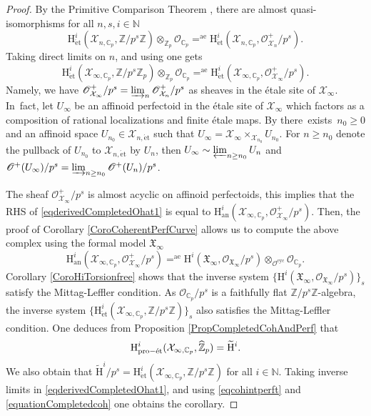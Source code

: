 \documentclass[11pt]{article}
\newcommand{\rae}{\mathrm{ae}}
\newcommand{\an}{\mathrm{an}}
\newcommand{\cyc}{\mathrm{cyc}}
\newcommand{\et}{\mathrm{\acute{e}t}}
\newcommand{\proet}{\mathrm{pro}\textup{-}\et}
\numberwithin{equation}{section}
\theoremstyle{definition}
\newcommand{\bb}[1]{\mathbb{#1}}
\newcommand{\n}[1]{\mathcal{#1}}
\newcommand{\f}[1]{\mathfrak{#1}}
\newcommand{\s}[1]{\mathscr{#1}}
\begin{document}
\begin{proof}
By the Primitive Comparison Theorem \cite[Th.\,5.1]{MR3090230}, there are almost quasi-isomorphisms for all $n,s,i\in \bb{N}$
\[
\mathrm{H}^i_{\et}(\n{X}_{n,\bb{C}_p}, \bb{Z}/p^s \bb{Z})\otimes_{\bb{Z}_p} \n{O}_{\bb{C}_p} =^{\rae} \mathrm{H}^i_{\et}(\n{X}_{n,\bb{C}_p}, \s{O}^+_{\n{X}_n} /p^s).
\]
Taking direct limits on $n$, and using \cite[Cor.,7.18]{MR3090258} one gets
\begin{equation}
\label{eqderivedCompletedOhat1}
\mathrm{H}^i_{\et}(\n{X}_{\infty, \bb{C}_p}, \bb{Z}/p^s \bb{Z}_p) \otimes_{\bb{Z}_p} \n{O}_{\bb{C}_p} =^{\rae} \mathrm{H}^i_{\et}(\n{X}_{\infty, \bb{C}_p}, \s{O}_{\n{X}_{\infty}}^+/p^s).
\end{equation}
Namely, we have $\s{O}^+_{\n{X}_{\infty}}/p^s= \varinjlim_{n} \s{O}^+_{\n{X}_n}/p^s$ as sheaves in the étale site of $\n{X}_{\infty}$. In~fact, let $U_{\infty}$ be an affinoid perfectoid in the étale site of $\n{X}_{\infty}$ which factors as a composition of rational localizations and finite étale maps. By \cite[Lem.\,7.5]{MR3090258} there~exists~\hbox{$n_0\!\geq\!0$} and an affinoid space $U_{n_0}\!\in\!\n{X}_{n,\et}$ such that $U_{\infty}\!=\!\n{X}_{\infty}\times_{\n{X}_{n_0}} U_{n_0}$. For $n\!\geq\!n_0$ denote the pullback of $U_{n_0}$ to $\n{X}_{n,\et}$ by $U_n$, then $U_{\infty}\sim \varprojlim_{n\geq n_0} U_{n}$ and $\s{O}^+(U_{\infty})/p^s=\varinjlim_{n\geq n_0} \s{O}^+(U_n)/p^s$.

The sheaf $\s{O}^+_{\n{X}_{\infty}}/p^s$ is almost acyclic on affinoid perfectoids, this implies that the RHS of \eqref{eqderivedCompletedOhat1} is equal to $\mathrm{H}^i_{\an}(\n{X}_{\infty,\bb{C}_p}, \s{O}^+_{\n{X}_{\infty}}/p^s)$. Then, the proof of Corollary \ref{CoroCoherentPerfCurve} allows us to compute the above complex using the formal model $\f{X}_{\infty}$
\begin{equation}
\label{eqcohintperft}
\mathrm{H}^i_{\an}(\n{X}_{\infty, \bb{C}_p}, \s{O}^+_{\n{X}_{\infty}}/p^s) =^{\rae} \mathrm{H}^i(\f{X}_{\infty}, \s{O}_{\f{X}_{\infty}}/p^s) \otimes_{\n{O}^{\cyc}} \n{O}_{\bb{C}_p}.
\end{equation}
Corollary \ref{CoroHiTorsionfree} shows that the inverse system $\{\mathrm{H}^i(\f{X}_{\infty}, \s{O}_{\f{X}_{\infty}}/p^s)\}_{s}$ satisfy the Mittag-Leffler condition. As $\n{O}_{\bb{C}_p}/p^s$ is a faithfully flat $\bb{Z}/p^s\bb{Z}$-algebra, the inverse system $\{\mathrm{H}^i_{\et}(\n{X}_{\infty, \bb{C}_p}, \bb{Z}/p^s \bb{Z})\}_s$ also satisfies the Mittag-Leffler condition. One deduces from Proposition \ref{PropCompletedCohAndPerf} that
\begin{equation}
\label{equationCompletedcoh}
\mathrm{H}^i_{\proet}(\n{X}_{\infty, \bb{C}_p}, \widehat{\bb{Z}}_p)= \widetilde{\mathrm{H}}^i.
\end{equation}
We also obtain that $\widetilde{\mathrm{H}}^i/p^s= \mathrm{H}^i_{\et}(\n{X}_{\infty,\bb{C}_p}, \bb{Z}/p^s \bb{Z})$ for all $i\in \bb{N}$. Taking inverse limits in \eqref{eqderivedCompletedOhat1}, and using \eqref{eqcohintperft} and \eqref{equationCompletedcoh} one obtains the corollary.
\end{proof}
\end{document}
